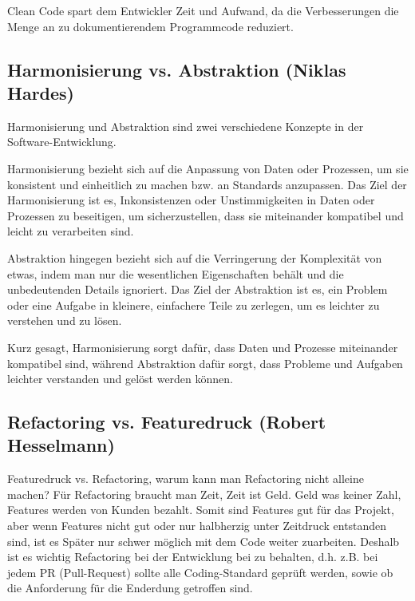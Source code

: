 Clean Code spart dem Entwickler Zeit und Aufwand, da die Verbesserungen die Menge an zu dokumentierendem Programmcode reduziert. 




\subsection*{Harmonisierung vs. Abstraktion (Niklas Hardes)}

Harmonisierung und Abstraktion sind zwei verschiedene Konzepte in der Software-Entwicklung.

Harmonisierung bezieht sich auf die Anpassung von Daten oder Prozessen, um sie konsistent und einheitlich zu machen bzw. an Standards anzupassen. Das Ziel der Harmonisierung ist es, Inkonsistenzen oder Unstimmigkeiten in Daten oder Prozessen zu beseitigen, um sicherzustellen, dass sie miteinander kompatibel und leicht zu verarbeiten sind.

Abstraktion hingegen bezieht sich auf die Verringerung der Komplexität von etwas, indem man nur die wesentlichen Eigenschaften behält und die unbedeutenden Details ignoriert. Das Ziel der Abstraktion ist es, ein Problem oder eine Aufgabe in kleinere, einfachere Teile zu zerlegen, um es leichter zu verstehen und zu lösen.

Kurz gesagt, Harmonisierung sorgt dafür, dass Daten und Prozesse miteinander kompatibel sind, während Abstraktion dafür sorgt, dass Probleme und Aufgaben leichter verstanden und gelöst werden können.



\subsection*{Refactoring vs. Featuredruck (Robert Hesselmann)}

Featuredruck vs. Refactoring, warum kann man Refactoring nicht alleine machen? Für Refactoring braucht man Zeit, Zeit ist Geld. Geld was keiner Zahl, Features werden von Kunden bezahlt. Somit sind Features gut für das Projekt, aber wenn Features nicht gut oder nur halbherzig unter Zeitdruck entstanden sind, ist es Später nur schwer möglich mit dem Code weiter zuarbeiten. Deshalb ist es wichtig Refactoring bei der Entwicklung bei zu behalten, d.h. z.B. bei jedem PR (Pull-Request) sollte alle Coding-Standard geprüft werden, sowie ob die Anforderung für die Enderdung getroffen sind.
